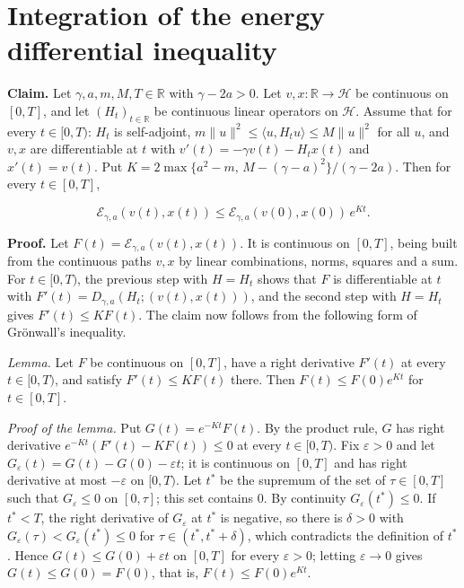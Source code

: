 \documentclass[11pt,a4paper]{article}
\begin{document}
\section{\texorpdfstring{Integration of the energy differential inequality}{Integration of the energy differential inequality}}


\textbf{Claim.} Let \(\gamma,a,m,M,T\in\mathbb R\) with \(\gamma-2a>0\). Let \(v,x:\mathbb R\to\mathcal H\) be continuous on \([0,T]\), and let \((H_t)_{t\in\mathbb R}\) be continuous linear operators on \(\mathcal H\). Assume that for every \(t\in[0,T)\): \(H_t\) is self-adjoint, \(m\|u\|^2\le\langle u,H_tu\rangle\le M\|u\|^2\) for all \(u\), and \(v,x\) are differentiable at \(t\) with \(v'(t)=-\gamma v(t)-H_tx(t)\) and \(x'(t)=v(t)\). Put \(K=2\max\{a^2-m,\,M-(\gamma-a)^2\}/(\gamma-2a)\). Then for every \(t\in[0,T]\),


\[\mathcal E_{\gamma,a}(v(t),x(t))\le\mathcal E_{\gamma,a}(v(0),x(0))\,e^{Kt}.\]


\textbf{Proof.} Let \(F(t)=\mathcal E_{\gamma,a}(v(t),x(t))\). It is continuous on \([0,T]\), being built from the continuous paths \(v,x\) by linear combinations, norms, squares and a sum. For \(t\in[0,T)\), the previous step with \(H=H_t\) shows that \(F\) is differentiable at \(t\) with \(F'(t)=D_{\gamma,a}(H_t;(v(t),x(t)))\), and the second step with \(H=H_t\) gives \(F'(t)\le KF(t)\). The claim now follows from the following form of Grönwall's inequality.




\emph{Lemma.} Let \(F\) be continuous on \([0,T]\), have a right derivative \(F'(t)\) at every \(t\in[0,T)\), and satisfy \(F'(t)\le KF(t)\) there. Then \(F(t)\le F(0)e^{Kt}\) for \(t\in[0,T]\).




\emph{Proof of the lemma.} Put \(G(t)=e^{-Kt}F(t)\). By the product rule, \(G\) has right derivative \(e^{-Kt}(F'(t)-KF(t))\le0\) at every \(t\in[0,T)\). Fix \(\varepsilon>0\) and let \(G_\varepsilon(t)=G(t)-G(0)-\varepsilon t\); it is continuous on \([0,T]\) and has right derivative at most \(-\varepsilon\) on \([0,T)\). Let \(t^*\) be the supremum of the set of \(\tau\in[0,T]\) such that \(G_\varepsilon\le0\) on \([0,\tau]\); this set contains \(0\). By continuity \(G_\varepsilon(t^*)\le0\). If \(t^*<T\), the right derivative of \(G_\varepsilon\) at \(t^*\) is negative, so there is \(\delta>0\) with \(G_\varepsilon(\tau)<G_\varepsilon(t^*)\le0\) for \(\tau\in(t^*,t^*+\delta)\), which contradicts the definition of \(t^*\). Hence \(G(t)\le G(0)+\varepsilon t\) on \([0,T]\) for every \(\varepsilon>0\); letting \(\varepsilon\to0\) gives \(G(t)\le G(0)=F(0)\), that is, \(F(t)\le F(0)e^{Kt}\).
\end{document}
